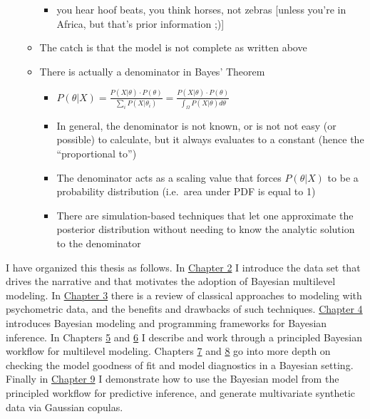 \documentclass[
]{article}
\providecommand{\tightlist}{%
  \setlength{\itemsep}{0pt}\setlength{\parskip}{0pt}}
\begin{document}
\begin{itemize}
\begin{itemize}
    \begin{itemize}
    \tightlist
    \item
      you hear hoof beats, you think horses, not zebras {[}unless you're in Africa, but that's prior information ;){]}
    \end{itemize}
  \item
    The catch is that the model is not complete as written above
  \item
    There is actually a denominator in Bayes' Theorem

    \begin{itemize}
    \tightlist
    \item
      \(P(\theta | X) = \frac{P(X | \theta)\cdot P(\theta)}{\sum_i P(X | \theta_i)} = \frac{P(X | \theta)\cdot P(\theta)}{\int_\Omega P(X | \theta)d\theta}\)
    \item
      In general, the denominator is not known, or is not not easy (or possible) to calculate, but it always evaluates to a constant (hence the ``proportional to'')
    \item
      The denominator acts as a scaling value that forces \(P(\theta|X)\) to be a probability distribution (i.e.~area under PDF is equal to 1)
    \item
      There are simulation-based techniques that let one approximate the posterior distribution without needing to know the analytic solution to the denominator
    \end{itemize}
  \end{itemize}
\end{itemize}

I have organized this thesis as follows. In \protect\hyperlink{motivating-data}{Chapter 2} I introduce the data set that drives the narrative and that motivates the adoption of Bayesian multilevel modeling. In \protect\hyperlink{classical-approaches}{Chapter 3} there is a review of classical approaches to modeling with psychometric data, and the benefits and drawbacks of such techniques. \protect\hyperlink{bayesian-modeling}{Chapter 4} introduces Bayesian modeling and programming frameworks for Bayesian inference. In Chapters \protect\hyperlink{multilevel-models}{5} and \protect\hyperlink{feature-engineering}{6} I describe and work through a principled Bayesian workflow for multilevel modeling. Chapters \protect\hyperlink{residual-analysis}{7} and \protect\hyperlink{model-checking}{8} go into more depth on checking the model goodness of fit and model diagnostics in a Bayesian setting. Finally in \protect\hyperlink{predictive-inference}{Chapter 9} I demonstrate how to use the Bayesian model from the principled workflow for predictive inference, and generate multivariate synthetic data via Gaussian copulas.
\end{document}
